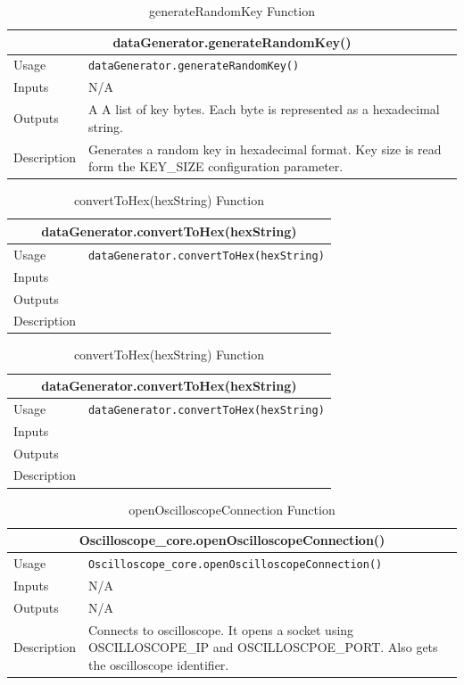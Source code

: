 \documentclass{llncs}
\numberwithin{algorithm}{chapter}
\begin{document}
\begin{table}
\caption{generateRandomKey Function}
\begin{tabular}{ |p{2cm}||p{11cm}|  }
 \hline
 \multicolumn{2}{|c|}{\cellcolor{teal}\textbf{dataGenerator.generateRandomKey()}} \\
 \hline
 Usage & \texttt{dataGenerator.generateRandomKey()}\\ \hline
 Inputs & N/A \\ \hline
 Outputs & A A list of key bytes. Each byte is represented as a hexadecimal string. \\ \hline
 Description & Generates a random key in hexadecimal format. Key size is read form the KEY_SIZE configuration parameter. \\ \hline
\end{tabular}
\end{table}

\begin{table}
\caption{convertToHex(hexString) Function}
\begin{tabular}{ |p{2cm}||p{11cm}|  }
 \hline
 \multicolumn{2}{|c|}{\cellcolor{teal}\textbf{dataGenerator.convertToHex(hexString)}} \\
 \hline
 Usage & \texttt{dataGenerator.convertToHex(hexString)}\\ \hline
 Inputs &  \\ \hline
 Outputs &  \\ \hline
 Description &  \\ \hline
\end{tabular}
\end{table}

\begin{table}
\caption{convertToHex(hexString) Function}
\begin{tabular}{ |p{2cm}||p{11cm}|  }
 \hline
 \multicolumn{2}{|c|}{\cellcolor{teal}\textbf{dataGenerator.convertToHex(hexString)}} \\
 \hline
 Usage & \texttt{dataGenerator.convertToHex(hexString)}\\ \hline
 Inputs &  \\ \hline
 Outputs &  \\ \hline
 Description &  \\ \hline
\end{tabular}
\end{table}

\begin{table}
\caption{openOscilloscopeConnection Function}
\begin{tabular}{ |p{2cm}||p{11cm}|  }
 \hline
 \multicolumn{2}{|c|}{\cellcolor{teal}\textbf{Oscilloscope\_core.openOscilloscopeConnection()}} \\
 \hline
 Usage & \texttt{Oscilloscope\_core.openOscilloscopeConnection()}\\ \hline
 Inputs & N/A  \\ \hline
 Outputs &  N/A \\ \hline
 Description & Connects to oscilloscope. It opens a socket using OSCILLOSCOPE\_IP and OSCILLOSCPOE\_PORT. Also gets the oscilloscope identifier. \\ \hline
\end{tabular}
\end{table}
\end{document}
